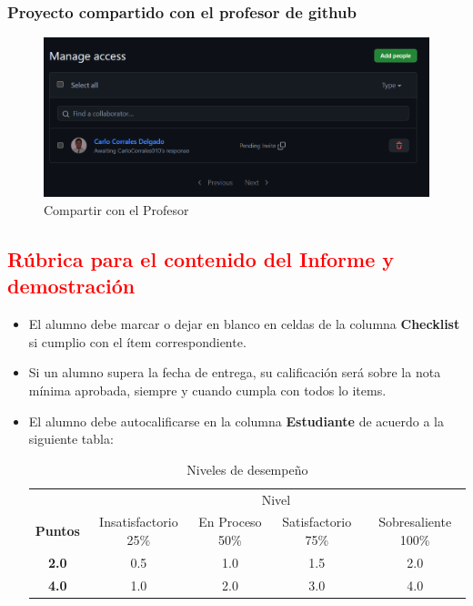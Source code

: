 \documentclass{article}
\begin{document}
	\subsubsection{Proyecto compartido con el profesor de github}
	\begin{figure}[H]
		\centering
		\includegraphics[width=1\textwidth,keepaspectratio]{img/Compartir.png}
		\caption{Compartir con el Profesor}
	\end{figure}
	\newpage
	\subsection{\textcolor{red}{Rúbrica para el contenido del Informe y demostración}}
	\begin{itemize}			
		\item El alumno debe marcar o dejar en blanco en celdas de la columna \textbf{Checklist} si cumplio con el ítem correspondiente.
		\item Si un alumno supera la fecha de entrega,  su calificación será sobre la nota mínima aprobada, siempre y cuando cumpla con todos lo items.
		\item El alumno debe autocalificarse en la columna \textbf{Estudiante} de acuerdo a la siguiente tabla:
	
		\begin{table}[ht]
			\caption{Niveles de desempeño}
			\begin{center}
			\begin{tabular}{ccccc}
    			\hline
    			 & \multicolumn{4}{c}{Nivel}\\
    			\cline{1-5}
    			\textbf{Puntos} & Insatisfactorio 25\%& En Proceso 50\% & Satisfactorio 75\% & Sobresaliente 100\%\\
    			\textbf{2.0}&0.5&1.0&1.5&2.0\\
    			\textbf{4.0}&1.0&2.0&3.0&4.0\\
    		\hline
			\end{tabular}
		\end{center}
	\end{table}	
	

	\end{itemize}
\end{document}
